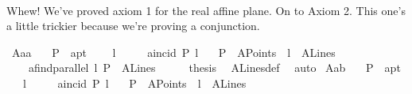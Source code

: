 \begin{isabellebody}
\ \ \isamarkupfalse%
\isanewline
{}\isamarkupfalse%
%
\endisatagproof
{\isafoldproof}%
%
\isadelimproof
%
\endisadelimproof
%
\begin{isamarkuptext}%
\done Whew! We've proved axiom 1 for the real affine plane. On to Axiom 2. This one's 
a little trickier because we're proving a conjunction. \caleb%
\end{isamarkuptext}\isamarkuptrue%
\isamarkupfalse%
\ A{}{\isacharunderscore}{\kern0pt}a{}a{\isacharcolon}{\kern0pt}\isanewline
\ \ \ P\ {\isacharcolon}{\kern0pt}{\isacharcolon}{\kern0pt}\ a{}pt\ \isanewline
\ \ \ l\ \isanewline
\ \ \ {\isachardoublequoteopen}{\isasymnot}\ {\isacharparenleft}{\kern0pt}a{}incid\ P\ l{\isacharparenright}{\kern0pt}{\isachardoublequoteclose}\isanewline
\ \ \ {\isachardoublequoteopen}P\ {\isasymin}\ A{}Points{\isachardoublequoteclose}\ \ {\isachardoublequoteopen}l\ {\isasymin}\ A{}Lines{\isachardoublequoteclose}\ \isanewline
\ \ \ \ {\isachardoublequoteopen}a{}find{\isacharunderscore}{\kern0pt}parallel\ l\ P\ {\isasymin}\ A{}Lines{\isachardoublequoteclose}\isanewline
%
\isadelimproof
%
\endisadelimproof
%
\isatagproof
{}\isamarkupfalse%
\ {\isacharminus}{\kern0pt}\isanewline
\ \ \isamarkupfalse%
\ {\isacharquery}{\kern0pt}thesis\ \isamarkupfalse%
\ A{}Lines{\isacharunderscore}{\kern0pt}def\ \isamarkupfalse%
\ auto\isanewline
{}\isamarkupfalse%
%
\endisatagproof
{\isafoldproof}%
%
\isadelimproof
\isanewline
%
\endisadelimproof
\isanewline
\isanewline
\isanewline
{}\isamarkupfalse%
\ A{}{\isacharunderscore}{\kern0pt}a{}b{\isacharcolon}{\kern0pt}\isanewline
\ \ \ P\ {\isacharcolon}{\kern0pt}{\isacharcolon}{\kern0pt}\ a{}pt\ \isanewline
\ \ \ l\ \isanewline
\ \ \ {\isachardoublequoteopen}{\isasymnot}\ {\isacharparenleft}{\kern0pt}a{}incid\ P\ l{\isacharparenright}{\kern0pt}{\isachardoublequoteclose}\isanewline
\ \ \ {\isachardoublequoteopen}P\ {\isasymin}\ A{}Points{\isachardoublequoteclose}\ \ {\isachardoublequoteopen}l\ {\isasymin}\ A{}Lines{\isachardoublequoteclose}\ \isanewline

\end{isabellebody}
